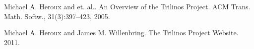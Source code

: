 
\begin{thebibliography}{10}

{\sc Michael A. Heroux and et. al.}. {An Overview of the Trilinos Project}. ACM Trans. Math. Softw., 31(3):397--423, 2005.



{\sc Michael A. Heroux and James M. Willenbring}. {The Trilinos Project Website}. 2011.

\end{thebibliography}
